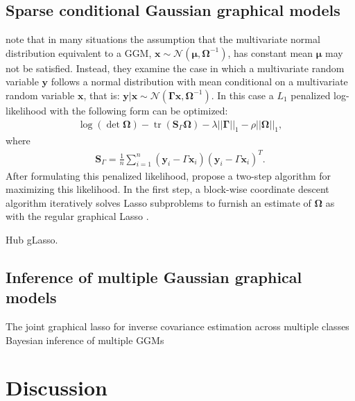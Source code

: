 \documentclass[11pt]{article}
\DeclareMathOperator{\tr}{tr}
\begin{document}
\subsection{Sparse conditional Gaussian graphical models}
 \cite{yin2011} note that in many situations the assumption that the multivariate normal distribution equivalent to a GGM,  $\textbf{x}\sim \mathcal{N}(\boldsymbol{\mu},\boldsymbol{\Omega}^{-1})$, has constant mean $\boldsymbol{\mu}$ may not be satisfied. Instead, they examine the case in which a multivariate random variable $\textbf{y}$ follows a normal distribution with mean conditional on a multivariate random variable $\textbf{x}$, that is: $\textbf{y}|\textbf{x}\sim \mathcal{N}(\boldsymbol{\Gamma} \textbf{x},\boldsymbol{\Omega}^{-1})$. In this case a $L_1$ penalized log-likelihood with the following form can be optimized:
 \begin{align}
 \log( \det \boldsymbol{\Omega})-\tr (\textbf{S}_{\Gamma}\boldsymbol{\Omega})-\lambda || \boldsymbol{\Gamma} ||_1 - \rho ||\boldsymbol{\Omega}||_1,
 \end{align}
 where 
 \begin{align*}
 \textbf{S}_{\Gamma}=\frac{1}{n}\sum_{i=1}^{n} (\textbf{y}_i-\Gamma \textbf{x}_i)(\textbf{y}_i-\Gamma \textbf{x}_i)^T.
 \end{align*}
 After formulating this penalized likelihood, \cite{yin2011} propose a two-step algorithm for maximizing this likelihood. In the first step, a block-wise coordinate descent algorithm iteratively solves Lasso subproblems to furnish an estimate of $\boldsymbol{\Omega}$ as with the regular graphical Lasso \cite{friedman2007}.

Hub gLasso. \cite{tan2014}

\subsection{Inference of multiple Gaussian graphical models}
The joint graphical lasso for inverse covariance estimation across multiple classes \cite{danaher2014}\\

Bayesian inference of multiple GGMs \cite{peterson2015}

\section{Discussion}



\end{document}
